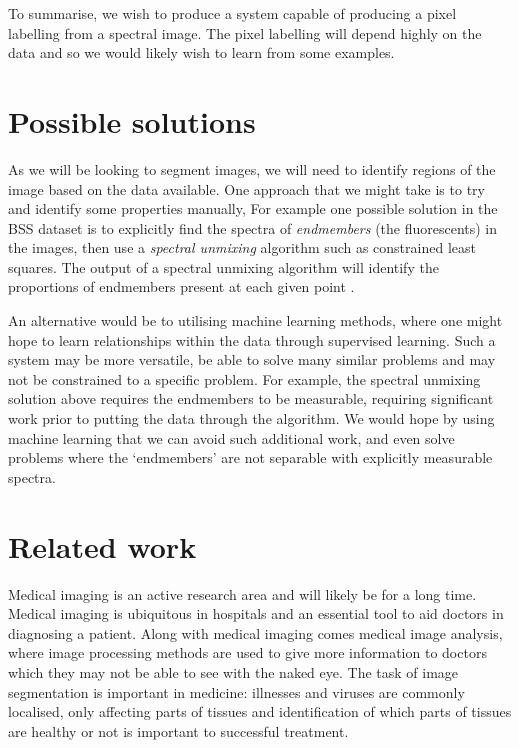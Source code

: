 \documentclass[12pt,twoside,notitlepage]{report}
\newcommand{\siris}{the BSS }
\begin{document}
        To summarise, we wish to produce a system capable of producing a pixel labelling from a spectral image. The 
        pixel labelling will depend highly on the data and so we would likely wish to learn from some examples.

    \section{Possible solutions}
        As we will be looking to segment images, we will need to identify regions of the image based on the data 
        available. One approach that we might take is to try and identify some properties manually, For example one 
        possible solution in \siris dataset is to explicitly find the spectra of \textit{endmembers} (the 
        fluorescents) in the images, then use a \textit{spectral unmixing} algorithm \cite{keshava2003survey} such as 
        constrained least squares. The output of a spectral unmixing algorithm will identify the proportions of endmembers 
        present at each given point \cite{Luthman:2015:hyperspectralImager}.

        An alternative would be to utilising machine learning methods, where one might hope to learn 
        relationships within the data through supervised learning. Such a system may be more versatile, be able to 
        solve many similar problems and may not be constrained to a specific problem. For example, the spectral unmixing 
        solution above requires the endmembers to be measurable, requiring significant work prior to putting the data 
        through the algorithm. We would hope by using machine learning that we can avoid such additional work, and even 
        solve problems where the `endmembers' are not separable with explicitly measurable spectra.

    \section{Related work}
        Medical imaging is an active research area and will likely be for a long time. Medical imaging is ubiquitous in 
        hospitals and an essential tool to aid doctors in diagnosing a patient. Along with medical imaging comes 
        medical image analysis, where image processing methods are used to give more information to doctors which they 
        may not be able to see with the naked eye. The task of image segmentation is important in medicine: illnesses and 
        viruses are commonly localised, only affecting parts of tissues and identification of which parts of tissues 
        are healthy or not is important to successful treatment.
\end{document}
